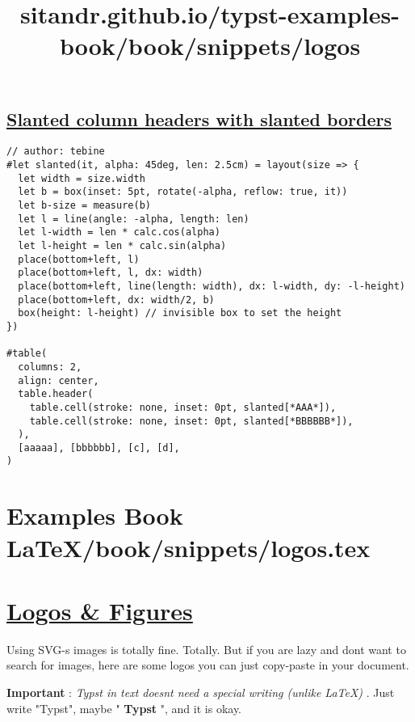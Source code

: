 \pandocbounded{}

\subsection{\texorpdfstring{\hyperref[slanted-column-headers-with-slanted-borders]{Slanted
column headers with slanted
borders}}{Slanted column headers with slanted borders}}\label{slanted-column-headers-with-slanted-borders}

\begin{verbatim}
// author: tebine
#let slanted(it, alpha: 45deg, len: 2.5cm) = layout(size => {
  let width = size.width
  let b = box(inset: 5pt, rotate(-alpha, reflow: true, it))
  let b-size = measure(b)
  let l = line(angle: -alpha, length: len)
  let l-width = len * calc.cos(alpha)
  let l-height = len * calc.sin(alpha)
  place(bottom+left, l)
  place(bottom+left, l, dx: width)
  place(bottom+left, line(length: width), dx: l-width, dy: -l-height)
  place(bottom+left, dx: width/2, b)
  box(height: l-height) // invisible box to set the height
})

#table(
  columns: 2,
  align: center,
  table.header(
    table.cell(stroke: none, inset: 0pt, slanted[*AAA*]),
    table.cell(stroke: none, inset: 0pt, slanted[*BBBBBB*]),
  ),
  [aaaaa], [bbbbbb], [c], [d],
)
\end{verbatim}

\pandocbounded{}


\section{Examples Book LaTeX/book/snippets/logos.tex}
\title{sitandr.github.io/typst-examples-book/book/snippets/logos}

\section{\texorpdfstring{\hyperref[logos--figures]{Logos \&
Figures}}{Logos \& Figures}}\label{logos--figures}

Using SVG-s images is totally fine. Totally. But if you are lazy and
don\textquotesingle t want to search for images, here are some logos you
can just copy-paste in your document.

\textbf{Important} : \emph{Typst in text doesn\textquotesingle t need a
special writing (unlike LaTeX)} . Just write "Typst", maybe "
\textbf{Typst} ", and it is okay.

